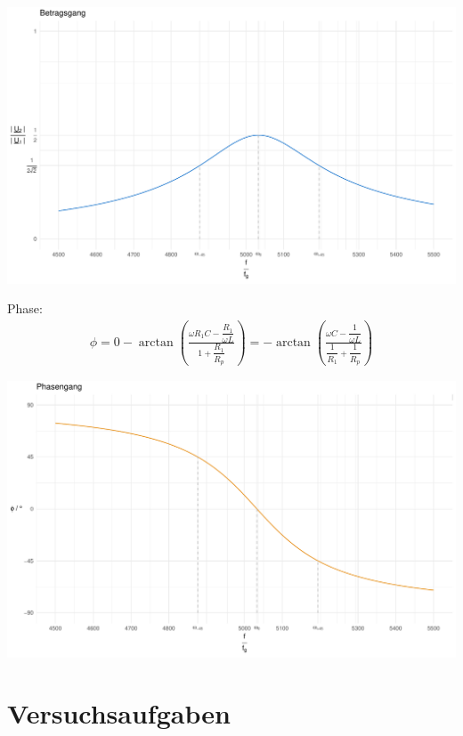 \documentclass[a4paper, 12pt]{article}
\begin{document}
    \begin{center}
      \includegraphics[scale=0.5]{./R/2_7/2_7_betrag_clean.pdf}
    \end{center}

  Phase:
    \begin{gather*}
      \phi = 0 - \arctan{\left( \frac{\omega R_1 C - \dfrac{R_1}{\omega L}}{1+ \dfrac{R_1}{R_p}} \right)} = -\arctan{\left( \frac{\omega C - \dfrac{1}{\omega L}}{\dfrac{1}{R_1}+ \dfrac{1}{R_p}} \right)}
    \end{gather*}
    \vspace{0.021276873\paperheight}
    \begin{center}
      \includegraphics[scale=0.5]{./R/2_7/2_7_phase_clean.pdf}
    \end{center}

\section{Versuchsaufgaben}
  \subsection{}
\end{document}
